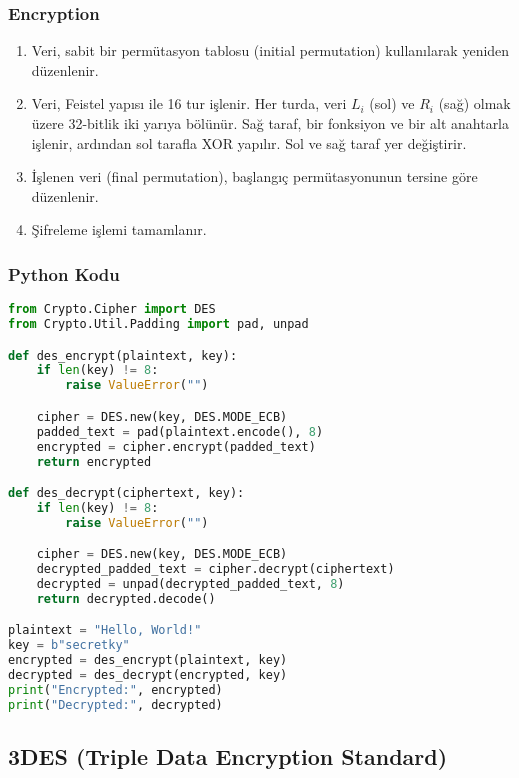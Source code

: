 \subsubsection{Encryption}

\begin{enumerate}
    \item Veri, sabit bir permütasyon tablosu (initial permutation) kullanılarak yeniden düzenlenir.
    \item Veri, Feistel yapısı ile 16 tur işlenir. Her turda, veri $L_i$ (sol) ve $R_i$ (sağ) olmak üzere 32-bitlik iki yarıya bölünür. Sağ taraf, bir fonksiyon ve bir alt anahtarla işlenir, ardından sol tarafla XOR yapılır. Sol ve sağ taraf yer değiştirir.
    \item İşlenen veri (final permutation), başlangıç permütasyonunun tersine göre düzenlenir.
    \item Şifreleme işlemi tamamlanır.
\end{enumerate}

\subsubsection{Python Kodu}

\begin{lstlisting}[language=Python]
from Crypto.Cipher import DES
from Crypto.Util.Padding import pad, unpad

def des_encrypt(plaintext, key):
    if len(key) != 8:
        raise ValueError("")

    cipher = DES.new(key, DES.MODE_ECB)
    padded_text = pad(plaintext.encode(), 8)
    encrypted = cipher.encrypt(padded_text)
    return encrypted

def des_decrypt(ciphertext, key):
    if len(key) != 8:
        raise ValueError("")

    cipher = DES.new(key, DES.MODE_ECB)
    decrypted_padded_text = cipher.decrypt(ciphertext)
    decrypted = unpad(decrypted_padded_text, 8)
    return decrypted.decode()

plaintext = "Hello, World!"
key = b"secretky"
encrypted = des_encrypt(plaintext, key)
decrypted = des_decrypt(encrypted, key)
print("Encrypted:", encrypted)
print("Decrypted:", decrypted)
\end{lstlisting}

\newpage

\subsection{3DES (Triple Data Encryption Standard)}


